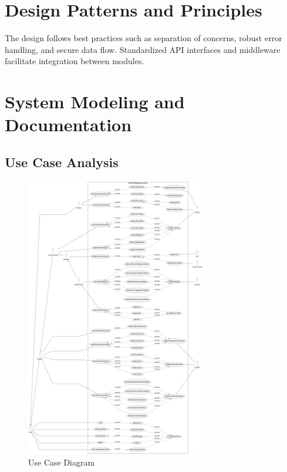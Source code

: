 \documentclass[12pt,a4paper]{report}
\begin{document}
\section{Design Patterns and Principles}
The design follows best practices such as separation of concerns, robust error handling, and secure data flow. Standardized API interfaces and middleware facilitate integration between modules.

\section{System Modeling and Documentation}
\subsection{Use Case Analysis}
\begin{figure}[h]
    \centering
    \includegraphics[width=0.7\textwidth]{use-case-diagram.png}
    \caption{Use Case Diagram}
    \label{fig:use-case-diagram}
\end{figure}
\end{document}
